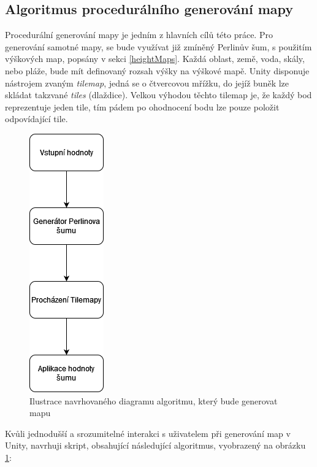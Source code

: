 \subsection{Algoritmus procedurálního generování mapy}
Procedurální generování mapy je jedním z hlavních cílů této práce. Pro generování samotné mapy, se bude využívat již zmíněný Perlinův šum, s použitím výškových map, popsány v sekci \ref{heightMaps}. Každá oblast, země, voda, skály, nebo pláže, bude mít definovaný rozsah výšky na výškové mapě. Unity disponuje nástrojem zvaným \textit{tilemap}, jedná se o čtvercovou mřížku, do jejíž buněk lze skládat takzvané \textit{tiles} (dlaždice). Velkou výhodou těchto tilemap je, že každý bod reprezentuje jeden tile, tím pádem po ohodnocení bodu lze pouze položit odpovídající tile.

\begin{figure}[H]
	\centering
	\includegraphics[scale=0.9]{obrazky-figures/AlgoritmusDiagram.png}
	\caption{Ilustrace navrhovaného diagramu algoritmu, který bude generovat mapu}
	\label{AlgoritmusDiagram}
\end{figure}

Kvůli jednodušší a srozumitelné interakci s uživatelem při generování map v Unity, navrhuji skript, obsahující následující algoritmus, vyobrazený na obrázku \ref{AlgoritmusDiagram}:

